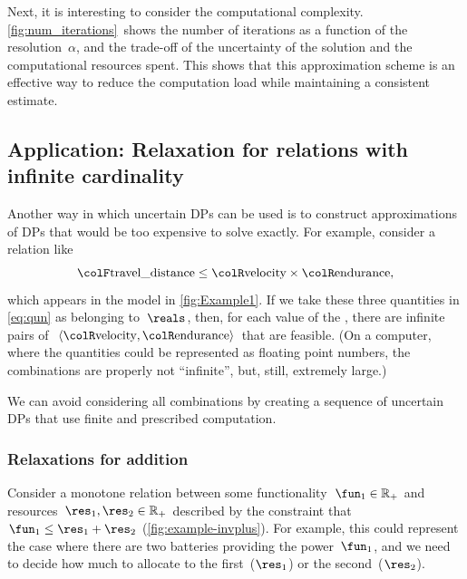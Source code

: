 Next, it is interesting to consider the computational complexity.
\cref{fig:num_iterations}~shows the number of iterations as
a function of the resolution~$\alpha$, and the trade-off of the
uncertainty of the solution and the computational resources spent.
This shows that this approximation scheme is an effective way to reduce
the computation load while maintaining a consistent estimate.


\subsection{Application: Relaxation for relations with infinite cardinality\label{sec:Application-relax}}

Another way in which uncertain DPs can be used is to construct approximations
of DPs that would be too expensive to solve exactly. For example,
consider a relation like
\begin{equation}
{\colF\text{travel\_distance}}\leq{\colR\text{velocity}}\times{\colR\text{endurance}},\label{eq:qun}
\end{equation}
which appears in the model in \cref{fig:Example1}. If we take
these three quantities in \cref{eq:qun} as belonging to~$\reals$,
then, for each value of the , there are infinite
pairs of~$\left\langle {\colR\text{velocity}},{\colR\text{endurance}}\right\rangle $
that are feasible. (On a computer, where the quantities could be represented
as floating point numbers, the combinations are properly not ``infinite'',
but, still, extremely large.)

We can avoid considering all combinations by creating a sequence of
uncertain DPs that use finite and prescribed computation.

\subsubsection{Relaxations for addition}

Consider a monotone relation between some functionality~$\fun_{1}\in\mathbb{R}_{+}$
and resources~$\res_{1},\res_{2}\in\mathbb{R}_{+}$ described by
the constraint that~$\fun_{1}\leq\res_{1}+\res_{2}$ (\cref{fig:example-invplus}).
For example, this could represent the case where there are two batteries
providing the power~$\fun_{1}$, and we need to decide how much to
allocate to the first~($\res_{1}$) or the second~($\res_{2}$).


